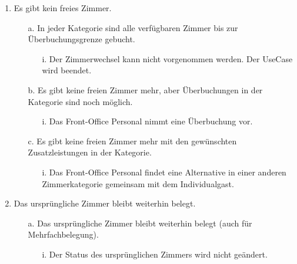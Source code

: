 \documentclass[./detailed_overview_usecases.tex]{subfiles}
\begin{document}
\begin{enumerate}
\begin{itemize}
\begin{itemize}
                \end{itemize}
        \end{itemize}
        \setcounter{enumi}{4}
        \item Es gibt kein freies Zimmer.
            \begin{itemize}
                \item[a.] In jeder Kategorie sind alle verfügbaren Zimmer bis zur Überbuchungsgrenze gebucht.
                    \begin{itemize}
                        \item[i.] Der Zimmerwechsel kann nicht vorgenommen werden. Der UseCase wird beendet.
                    \end{itemize}
                \item[b.] Es gibt keine freien Zimmer mehr, aber Überbuchungen in der Kategorie sind noch möglich.
                    \begin{itemize}
                        \item[i.] Das Front-Office Personal nimmt eine Überbuchung vor.
                     \end{itemize}
                \item[c.] Es gibt keine freien Zimmer mehr mit den gewünschten Zusatzleistungen in der Kategorie.
                        \begin{itemize}
                            \item[i.] Das Front-Office Personal findet eine Alternative in einer anderen Zimmerkategorie gemeinsam mit dem Individualgast.
                        \end{itemize}
            \end{itemize}
        \setcounter{enumi}{6}
        \item Das ursprüngliche Zimmer bleibt weiterhin belegt.
            \begin{itemize}
                \item[a.] Das ursprüngliche Zimmer bleibt weiterhin belegt (auch für Mehrfachbelegung).
                    \begin{itemize}
                        \item[i.] Der Status des ursprünglichen Zimmers wird nicht geändert.
                    \end{itemize}
            \end{itemize}
    \end{enumerate}
\end{document}
